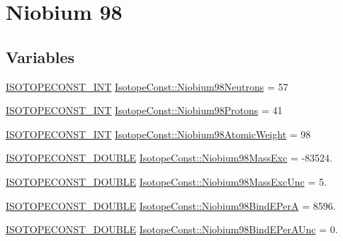 \hypertarget{group___isotope_const-_niobium-_nb98}{}\section{Niobium 98}
\label{group___isotope_const-_niobium-_nb98}
\subsection*{Variables}
\begin{DoxyCompactItemize}
\item 
\mbox{\hyperlink{group___isotope_const-_macros_ga5f18360b3e99483a35c32d789e62621c}{I\+S\+O\+T\+O\+P\+E\+C\+O\+N\+S\+T\+\_\+\+I\+NT}} \mbox{\hyperlink{group___isotope_const-_niobium-_nb98_ga32f8fb4f8e820fb26f1d057b6733e073}{Isotope\+Const\+::\+Niobium98\+Neutrons}} = 57
\item 
\mbox{\hyperlink{group___isotope_const-_macros_ga5f18360b3e99483a35c32d789e62621c}{I\+S\+O\+T\+O\+P\+E\+C\+O\+N\+S\+T\+\_\+\+I\+NT}} \mbox{\hyperlink{group___isotope_const-_niobium-_nb98_ga11a2f01acf32259029e45c499c7548d3}{Isotope\+Const\+::\+Niobium98\+Protons}} = 41
\item 
\mbox{\hyperlink{group___isotope_const-_macros_ga5f18360b3e99483a35c32d789e62621c}{I\+S\+O\+T\+O\+P\+E\+C\+O\+N\+S\+T\+\_\+\+I\+NT}} \mbox{\hyperlink{group___isotope_const-_niobium-_nb98_gafd90812761cfbdab1731ce357356ecc6}{Isotope\+Const\+::\+Niobium98\+Atomic\+Weight}} = 98
\item 
\mbox{\hyperlink{group___isotope_const-_macros_ga8f45a7272ce02c0b4c65c44636ed719a}{I\+S\+O\+T\+O\+P\+E\+C\+O\+N\+S\+T\+\_\+\+D\+O\+U\+B\+LE}} \mbox{\hyperlink{group___isotope_const-_niobium-_nb98_ga3c4eae82d53fa1082989f5f533fb8bb8}{Isotope\+Const\+::\+Niobium98\+Mass\+Exc}} = -\/83524.
\item 
\mbox{\hyperlink{group___isotope_const-_macros_ga8f45a7272ce02c0b4c65c44636ed719a}{I\+S\+O\+T\+O\+P\+E\+C\+O\+N\+S\+T\+\_\+\+D\+O\+U\+B\+LE}} \mbox{\hyperlink{group___isotope_const-_niobium-_nb98_gada091a827ca6f1d9ccf2d175dbd4cf65}{Isotope\+Const\+::\+Niobium98\+Mass\+Exc\+Unc}} = 5.
\item 
\mbox{\hyperlink{group___isotope_const-_macros_ga8f45a7272ce02c0b4c65c44636ed719a}{I\+S\+O\+T\+O\+P\+E\+C\+O\+N\+S\+T\+\_\+\+D\+O\+U\+B\+LE}} \mbox{\hyperlink{group___isotope_const-_niobium-_nb98_gaf7429abc9449e88f46cf392b54aca6d0}{Isotope\+Const\+::\+Niobium98\+Bind\+E\+PerA}} = 8596.
\item 
\mbox{\hyperlink{group___isotope_const-_macros_ga8f45a7272ce02c0b4c65c44636ed719a}{I\+S\+O\+T\+O\+P\+E\+C\+O\+N\+S\+T\+\_\+\+D\+O\+U\+B\+LE}} \mbox{\hyperlink{group___isotope_const-_niobium-_nb98_ga859cd45f693b8c1874f234c41507411b}{Isotope\+Const\+::\+Niobium98\+Bind\+E\+Per\+A\+Unc}} = 0.

\end{DoxyCompactItemize}
